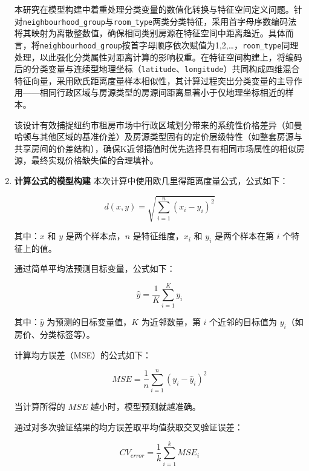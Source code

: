 \documentclass[12pt]{article}
\begin{document}
\begin{CJK}{UTF8}{gbsn}
\begin{enumerate}
		本研究在模型构建中着重处理分类变量的数值化转换与特征空间定义问题。针对\texttt{neighbourhood\_group}与\texttt{room\_type}两类分类特征，采用首字母序数编码法将其映射为离散整数值，确保相同类别房源在特征空间中距离趋近。具体而言，将\texttt{neighbourhood\_group}按首字母顺序依次赋值为1,2,\dots，\texttt{room\_type}同理处理，以此强化分类属性对距离计算的影响权重。在特征空间构建上，将编码后的分类变量与连续型地理坐标（\texttt{latitude}、\texttt{longitude}）共同构成四维混合特征向量，采用欧氏距离度量样本相似性，其计算过程突出分类变量的主导作用——相同行政区域与房源类型的房源间距离显著小于仅地理坐标相近的样本。
		
		该设计有效捕捉纽约市租房市场中行政区域划分带来的系统性价格差异（如曼哈顿与其他区域的基准价差）及房源类型固有的定价层级特性（如整套房源与共享房间的价差结构），确保K近邻插值时优先选择具有相同市场属性的相似房源，最终实现价格缺失值的合理填补。
		
		\item \textbf{计算公式的模型构建}  
		本次计算中使用欧几里得距离度量公式，公式如下：
		
		\begin{equation}
			d(x, y) = \sqrt{\sum_{i=1}^{n} (x_i - y_i)^2}
		\end{equation}
		
		其中：\( x \) 和 \( y \) 是两个样本点，\( n \) 是特征维度，\( x_i \) 和 \( y_i \) 是两个样本在第 \( i \) 个特征上的值。
		
		通过简单平均法预测目标变量，公式如下：
		
		\begin{equation}
			\hat{y} = \frac{1}{K} \sum_{i=1}^{K} y_i
		\end{equation}
		
		其中：\( \hat{y} \) 为预测的目标变量值，\( K \) 为近邻数量，第 \( i \) 个近邻的目标值为 \( y_i \)（如房价、分类标签等）。
		
		计算均方误差（MSE）的公式如下：
		
		\begin{equation}
			MSE = \frac{1}{n} \sum_{i=1}^{n} (y_i - \hat{y}_i)^2
		\end{equation}
		
		当计算所得的 \( MSE \) 越小时，模型预测就越准确。
		
		通过对多次验证结果的均方误差取平均值获取交叉验证误差：
		
		\begin{equation}
			CV_{error} = \frac{1}{k} \sum_{i=1}^{k} MSE_i
		\end{equation}
		

\end{enumerate}
\end{CJK}
\end{document}
